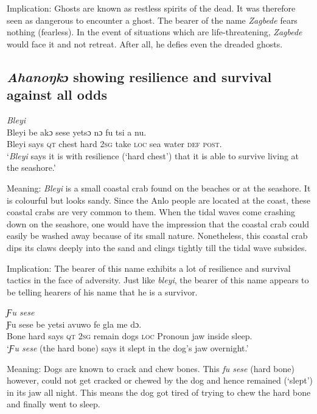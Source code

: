 \documentclass[output=paper]{langscibook}
\begin{document}
Implication: Ghosts are known as restless spirits of the dead. It was therefore seen as dangerous to encounter a ghost. The bearer of the name {\textit{Zagbede}} fears nothing (fearless). In the event of situations which are life-threatening, {\textit{Zagbede}} would face it and not retreat. After all, he defies even the dreaded ghosts.

\subsection{{\textit{Ahanoŋkɔ}} showing resilience and survival against all odds}
\ea \emph {Bleyi}\\
\gll Bleyi be akɔ sese yetsɔ nɔ ƒu tsi a nu.\\
Bleyi {says \textsc{qt}} chest hard {\textsc{2sg} take} \textsc{loc} sea water \textsc{def} \textsc{post}.\\
\glt  ‘{\textit{Bleyi}} says it is with resilience (‘hard chest’) that it is able to survive living at the seashore.’
\z

\noindent Meaning: \textit{Bleyi} is a small coastal crab found on the beaches or at the seashore. It is colourful but looks sandy. Since the Anlo people are located at the coast, these coastal crabs are very common to them.  When the tidal waves come crashing down on the seashore, one would have the impression that the coastal crab could easily be washed away because of its small nature. Nonetheless, this coastal crab dips its claws deeply into the sand and clings tightly till the tidal wave subsides.

Implication: The bearer of this name exhibits a lot of resilience and survival tactics in the face of adversity. Just like {\textit{bleyi}}, the bearer of this name appears to be telling hearers of his name that he is a survivor.


\ea \emph{Ƒu sese}\\
\gll Ƒu sese be yetsi avuwo ƒe gla me dɔ.\\
Bone hard {says \textsc{qt}} {\textsc{2sg} remain} dogs {\textsc{loc} Pronoun} jaw inside sleep.\\
\glt  ‘{\textit{Ƒu sese}} (the hard bone) says it slept in the dog’s jaw overnight.’
\z

\noindent Meaning: Dogs are known to crack and chew bones. This \textit{fu sese} (hard bone) however, could not get cracked or chewed by the dog and hence remained (‘slept’) in its jaw all night. This means the dog got tired of trying to chew the hard bone and finally went to sleep.
\end{document}
